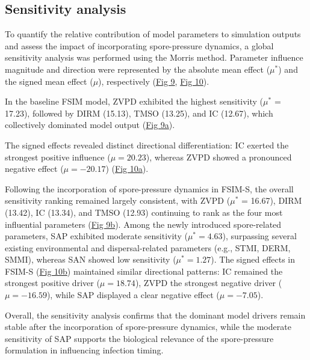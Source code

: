 \documentclass[
]{article}
\begin{document}
\subsection{Sensitivity analysis}\label{sensitivity-analysis}

To quantify the relative contribution of model parameters to simulation
outputs and assess the impact of incorporating spore-pressure dynamics,
a global sensitivity analysis was performed using the Morris method.
Parameter influence magnitude and direction were represented by the
absolute mean effect (\(\mu^*\)) and the signed mean effect (\(\mu\)), respectively
(\hyperref[_Ref222510092]{Fig 9}, \hyperref[_Ref222510103]{Fig 10}).

In the baseline FSIM model, ZVPD exhibited the highest sensitivity (\(\mu^*\) =
17.23), followed by DIRM (15.13), TMSO (13.25), and IC (12.67), which
collectively dominated model output (\hyperref[_Ref222510092]{Fig 9a}).

The signed effects revealed distinct directional differentiation: IC
exerted the strongest positive influence (\(\mu = 20.23\)), whereas ZVPD
showed a pronounced negative effect (\(\mu = -20.17\))
(\hyperref[_Ref222510103]{Fig 10a}).

Following the incorporation of spore-pressure dynamics in FSIM-S, the
overall sensitivity ranking remained largely consistent, with ZVPD (\(\mu^*\) =
16.67), DIRM (13.42), IC (13.34), and TMSO (12.93) continuing to rank as
the four most influential parameters (\hyperref[_Ref222510092]{Fig 9b}).
Among the newly introduced spore-related parameters, SAP exhibited
moderate sensitivity (\(\mu^* = 4.63\)), surpassing several existing
environmental and dispersal-related parameters (e.g., STMI, DERM, SMMI),
whereas SAN showed low sensitivity (\(\mu^* = 1.27\)). The signed effects in
FSIM-S (\hyperref[_Ref222510103]{Fig 10b}) maintained similar
directional patterns: IC remained the strongest positive driver
(\(\mu = 18.74\)), ZVPD the strongest negative driver
(\(\mu = -16.59\)), while SAP displayed a clear negative effect
(\(\mu = -7.05\)).

Overall, the sensitivity analysis confirms that the dominant model
drivers remain stable after the incorporation of spore-pressure
dynamics, while the moderate sensitivity of SAP supports the biological
relevance of the spore-pressure formulation in influencing infection
timing.
\end{document}
